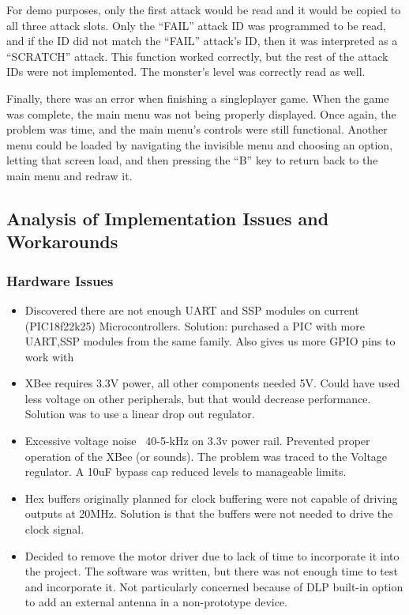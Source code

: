 \documentclass[12pt]{article} %
\begin{document}
For demo purposes, only the first attack would be read and it would be copied
to all three attack slots.  Only the ``FAIL'' attack ID was programmed to be
read, and if the ID did not match the ``FAIL'' attack's ID, then it was
interpreted as a ``SCRATCH'' attack.  This function worked correctly, but the
rest of the attack IDs were not implemented.  The monster's level was correctly
read as well.

Finally, there was an error when finishing a singleplayer game.  When the game
was complete, the main menu was not being properly displayed.  Once again, the
problem was time, and the main menu's controls were still functional.  Another
menu could be loaded by navigating the invisible menu and choosing an option,
letting that screen load, and then pressing the ``B'' key to return back to the
main menu and redraw it.

\subsection{Analysis of Implementation Issues and Workarounds} %
%
%
\subsubsection{Hardware Issues}
\begin{itemize}
	\item Discovered there are not enough UART and SSP modules on current (PIC18f22k25) Microcontrollers. Solution: purchased a PIC with more UART,SSP modules from the same family. Also gives us more GPIO pins to work with
	\item XBee requires 3.3V power, all other components needed 5V. Could have used less voltage on other peripherals, but that would decrease performance. Solution was to use a linear drop out regulator.
	\item  Excessive voltage noise ~40-5-kHz on 3.3v power rail. Prevented proper operation of the XBee (or sounds). The problem was traced to the Voltage regulator. A 10uF bypass cap reduced levels to manageable limits.
	\item Hex buffers originally planned for clock buffering were not capable of driving outputs at 20MHz. Solution is that the buffers were not needed to drive the clock signal.
	\item Decided to remove the motor driver due to lack of time to incorporate it into the project. The software was written, but there was not enough time to test and incorporate it. Not particularly concerned because of DLP built-in option to add an external antenna in a non-prototype device.
\end{itemize}
\end{document}
